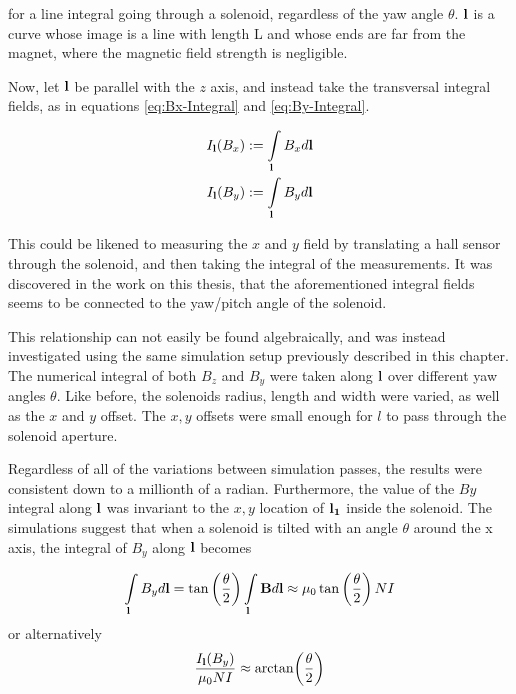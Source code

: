for a line integral going through a solenoid, regardless of the yaw
angle $\theta$. $\vb{l}$ is a curve whose image
is a line with length L and whose ends are far from the magnet, where
the magnetic field strength is negligible.

Now, let $\vb{l}$ be parallel with the $z$ axis, and instead take the
transversal integral fields, as in equations \ref{eq:Bx-Integral} and
\ref{eq:By-Integral}.

\begin{align}
    I_{\vb{l}}(B_x) & := \int \limits_{\vb{l}} B_x d\vb{l}
    \label{eq:Bx-Integral}                                 \\
    I_{\vb{l}}(B_y) & := \int \limits_{\vb{l}} B_y d\vb{l}
    \label{eq:By-Integral}
\end{align}

This could be
likened to measuring the $x$ and $y$ field by translating a hall sensor
through the solenoid, and then taking the integral of the measurements.
It was discovered in the work on this thesis, that the aforementioned
integral fields seems to be connected to the yaw/pitch angle of the
solenoid.

This relationship can not easily
be found algebraically, and was instead investigated using the same
simulation setup previously described in this chapter. The numerical integral of
both $B_z$ and $B_y$ were taken along $\vb{l}$ over different yaw angles $\theta$.
Like before, the solenoids
radius, length and width were varied, as well as the $x$ and $y$ offset.
The $x, y$ offsets were small enough
for $l$ to pass through the solenoid aperture.

Regardless of all of the variations between simulation passes, the results were
consistent down to a millionth of a radian.
Furthermore, the value of the $By$ integral along $\vb{l}$
was invariant to the $x,y$ location of $\vb{l_1}$ inside the solenoid.
The simulations suggest that when a solenoid is tilted with an angle $\theta$
around the x axis, the integral of $B_y$ along $\vb{l}$ becomes

\begin{equation}
    \int\limits_{\vb{l}}B_y d\vb{l} =
    \tan\left( \frac{\theta}{2} \right)  \int\limits_{\vb{l}}\vb{B} d\vb{l}
    \approx \mu_0\tan\left( \frac{\theta}{2} \right) NI
    \label{eq:tanhalf}
\end{equation}
or alternatively
\begin{equation}
    \frac{I_{\vb{l}}(B_y)}{\mu_0NI} \approx \arctan(\frac{\theta}{2})
    \label{eq:Byint-Error}
\end{equation}

